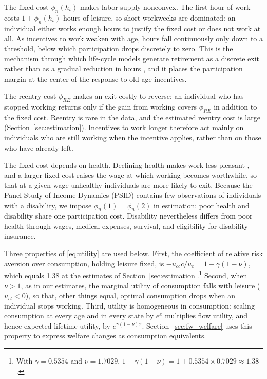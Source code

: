 The fixed cost $\phi_n(h_t)$ makes labor supply nonconvex. The first hour of work costs $1+\phi_n(h_t)$ hours of leisure, so short workweeks are dominated: an individual either works enough hours to justify the fixed cost or does not work at all. As incentives to work weaken with age, hours fall continuously only down to a threshold, below which participation drops discretely to zero. This is the mechanism through which life-cycle models generate retirement as a discrete exit rather than as a gradual reduction in hours \citep{french2005effects,prescott2009lifetime,rogerson2013nonconvexities}, and it places the participation margin at the center of the response to old-age incentives.

The reentry cost $\phi_{RE}$ makes an exit costly to reverse: an individual who has stopped working returns only if the gain from working covers $\phi_{RE}$ in addition to the fixed cost. Reentry is rare in the data, and the estimated reentry cost is large (Section~\ref{sec:estimation}). Incentives to work longer therefore act mainly on individuals who are still working when the incentive applies, rather than on those who have already left.

The fixed cost depends on health. Declining health makes work less pleasant \citep{blundell2016retirement}, and a larger fixed cost raises the wage at which working becomes worthwhile, so that at a given wage unhealthy individuals are more likely to exit. Because the Panel Study of Income Dynamics (PSID) contains few observations of individuals with a disability, we impose $\phi_n(1)=\phi_n(2)$ in estimation: poor health and disability share one participation cost. Disability nevertheless differs from poor health through wages, medical expenses, survival, and eligibility for disability insurance.

Three properties of \eqref{eq:utility} are used below. First, the coefficient of relative risk aversion over consumption, holding leisure fixed, is $-u_{cc}c/u_c=1-\gamma(1-\nu)$, which equals 1.38 at the estimates of Section~\ref{sec:estimation}.\footnote{With $\gamma=0.5354$ and $\nu=1.7029$, $1-\gamma(1-\nu)=1+0.5354\times0.7029\approx1.38$.} Second, when $\nu>1$, as in our estimates, the marginal utility of consumption falls with leisure ($u_{cl}<0$), so that, other things equal, optimal consumption drops when an individual stops working. Third, utility is homogeneous in consumption: scaling consumption at every age and in every state by $e^{x}$ multiplies flow utility, and hence expected lifetime utility, by $e^{\gamma(1-\nu)x}$. Section~\ref{sec:fw_welfare} uses this property to express welfare changes as consumption equivalents.

